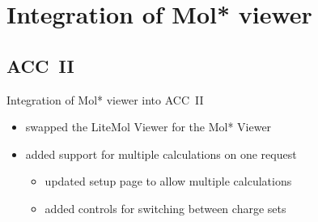 \documentclass[
]{beamer}
\begin{document}
\begin{frame}{}
  \begin{figure}
    \centering
  \end{figure}  
\end{frame}

\section[Integration of Mol* viewer]{Integration of Mol* viewer}

\subsection[ACC~II]{ACC~II}

\begin{frame}{Integration of Mol* viewer into ACC~II}
  \begin{itemize}
    \item swapped the LiteMol Viewer for the Mol* Viewer
    \item added support for multiple calculations on one request
    \begin{itemize}
      \item updated setup page to allow multiple calculations
      \item added controls for switching between charge sets
    \end{itemize}
  \end{itemize}
\end{frame}
\end{document}
